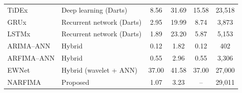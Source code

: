 \begin{table}[!htbp]
\begin{tabular}{llcccc}
{\color{blue}TiDEx} & Deep learning (Darts) & 8.56 & 31.69 & 15.58 & 23,518 \\
{\color{blue}GRUx} & Recurrent network (Darts) & 2.95 & 19.99 & 8.74 & 3,873 \\
{\color{blue}LSTMx} & Recurrent network (Darts) & 1.89 & 23.20 & 5.87 & 5,153 \\
{\color{blue}ARIMA--ANN} & Hybrid & 0.12 & 1.82 & 0.12 & 402 \\
{\color{blue}ARFIMA--ANN} & Hybrid & 0.55 & 2.96 & 0.55 & 3,306 \\
{\color{blue}EWNet} & Hybrid (wavelet + ANN) & 37.00 & 41.58 & 37.00 & 27,000 \\
{\color{blue}NARFIMA} & Proposed & 1.07 & 3.23 & -- & 29,011 \\
\hline
\end{tabular}
\label{tab:computational_cost}
\end{table}
